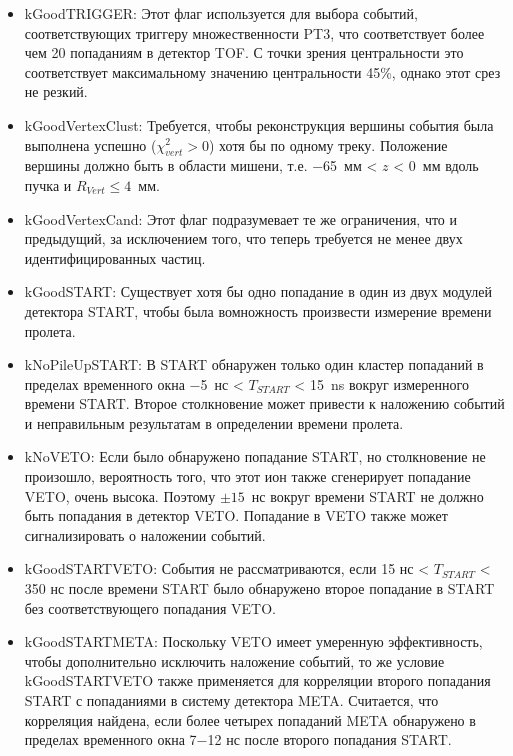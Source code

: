 \begin{itemize}
    \item kGoodTRIGGER: Этот флаг используется для выбора событий, соответствующих триггеру множественности PT3, что соответствует более чем 20 попаданиям в детектор TOF. 
    С точки зрения центральности это соответствует максимальному значению центральности 45\%, однако этот срез не резкий.
    \item kGoodVertexClust: Требуется, чтобы реконструкция вершины события была выполнена успешно ($\chi^2_{vert} > 0$) хотя бы по одному треку. 
    Положение вершины должно быть в области мишени, т.е. −65~мм < $z$ < 0~мм вдоль пучка и $R_{Vert} \le 4$~мм.
    \item kGoodVertexCand: Этот флаг подразумевает те же ограничения, что и предыдущий, за исключением того, что теперь требуется не менее двух идентифицированных частиц.
    \item kGoodSTART: Существует хотя бы одно попадание в один из двух модулей детектора START, чтобы была вомножность произвести измерение времени пролета.
    \item kNoPileUpSTART: В START обнаружен только один кластер попаданий в пределах временного окна −5~нс < $T_{START}$ < 15~ns вокруг измеренного времени START.
    Второе столкновение может привести к  наложению событий и неправильным результатам в определении времени пролета.
    \item kNoVETO: Если было обнаружено попадание START, но столкновение не произошло, вероятность того, что этот ион также сгенерирует попадание VETO, очень высока. 
    Поэтому $\pm15$~нс вокруг времени START не должно быть попадания в детектор VETO. 
    Попадание в VETO также может сигнализировать о наложении событий.
    \item kGoodSTARTVETO: События не рассматриваются, если 15 нс < $T_{START}$ < 350 нс после времени START было обнаружено второе попадание в START без соответствующего попадания VETO.
    \item kGoodSTARTMETA: Поскольку VETO имеет умеренную эффективность, чтобы дополнительно исключить наложение событий, то же условие kGoodSTARTVETO также применяется для корреляции второго попадания START с попаданиями в систему детектора META. 
    Считается, что корреляция найдена, если более четырех попаданий META обнаружено в пределах временного окна 7−12 нс после второго попадания START.
\end{itemize}

